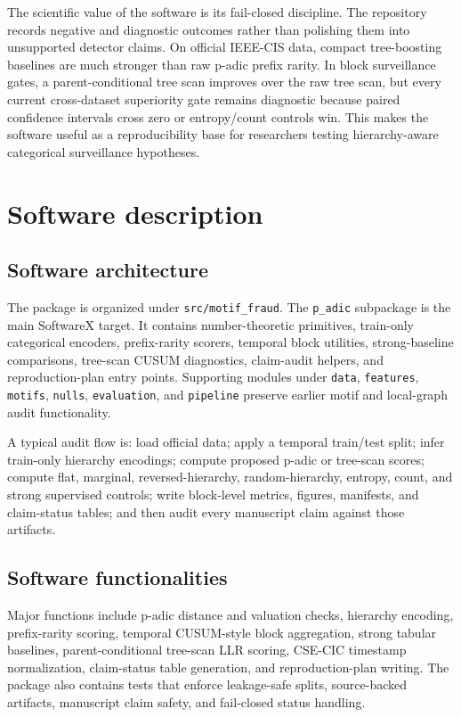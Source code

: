 \documentclass[preprint,12pt,a4paper]{elsarticle}
\begin{document}
The scientific value of the software is its fail-closed discipline. The repository records negative and diagnostic outcomes rather than polishing them into unsupported detector claims. On official IEEE-CIS data, compact tree-boosting baselines are much stronger than raw p-adic prefix rarity. In block surveillance gates, a parent-conditional tree scan improves over the raw tree scan, but every current cross-dataset superiority gate remains diagnostic because paired confidence intervals cross zero or entropy/count controls win. This makes the software useful as a reproducibility base for researchers testing hierarchy-aware categorical surveillance hypotheses.

\section{Software description}
\subsection{Software architecture}
The package is organized under \texttt{src/motif\_fraud}. The \texttt{p\_adic} subpackage is the main SoftwareX target. It contains number-theoretic primitives, train-only categorical encoders, prefix-rarity scorers, temporal block utilities, strong-baseline comparisons, tree-scan CUSUM diagnostics, claim-audit helpers, and reproduction-plan entry points. Supporting modules under \texttt{data}, \texttt{features}, \texttt{motifs}, \texttt{nulls}, \texttt{evaluation}, and \texttt{pipeline} preserve earlier motif and local-graph audit functionality.

A typical audit flow is: load official data; apply a temporal train/test split; infer train-only hierarchy encodings; compute proposed p-adic or tree-scan scores; compute flat, marginal, reversed-hierarchy, random-hierarchy, entropy, count, and strong supervised controls; write block-level metrics, figures, manifests, and claim-status tables; and then audit every manuscript claim against those artifacts.

\subsection{Software functionalities}
Major functions include p-adic distance and valuation checks, hierarchy encoding, prefix-rarity scoring, temporal CUSUM-style block aggregation, strong tabular baselines, parent-conditional tree-scan LLR scoring, CSE-CIC timestamp normalization, claim-status table generation, and reproduction-plan writing. The package also contains tests that enforce leakage-safe splits, source-backed artifacts, manuscript claim safety, and fail-closed status handling.
\end{document}
